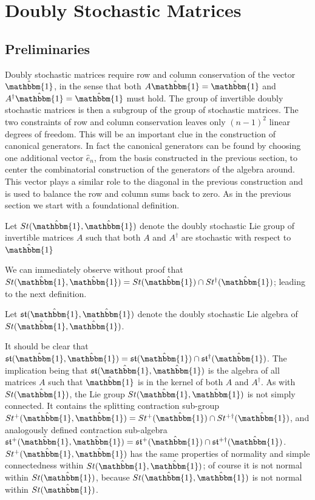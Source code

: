 \section{Doubly Stochastic Matrices}
\subsection{Preliminaries}
Doubly stochastic matrices require row and column conservation of the vector $\hat{\mathbbm{1}}$, 
in the sense that both $A \hat{\mathbbm{1}} = \hat{\mathbbm{1}}$ and $A^\dagger \hat{\mathbbm{1}} = \hat{\mathbbm{1}}$ 
must hold. The group of invertible doubly stochastic matrices is then a subgroup of the
group of stochastic matrices. The two constraints of row and column conservation leaves only
$\left(n - 1\right)^2$ linear degrees of freedom. This will be an important clue in the
construction of canonical generators. In fact the canonical generators can be found by
choosing one additional vector $\hat{e}_n$, from the basis constructed in the previous
section, to center the combinatorial construction of the generators of the algebra around.
This vector plays a similar role to the diagonal in the previous construction and is used to
balance the row and column sums back to zero. As in the previous section we start with a 
foundational definition.
\begin{definition}
	Let $St(\hat{\mathbbm{1}}, \hat{\mathbbm{1}})$ denote the doubly stochastic 
	Lie group of invertible matrices $A$ such that both $A$ and $A^\dagger$ are 
	stochastic with respect to $\hat{\mathbbm{1}}$
\end{definition}
We can immediately observe without proof that $St(\hat{\mathbbm{1}}, \hat{\mathbbm{1}}) = St(\hat{\mathbbm{1}}) \cap St^\dagger(\hat{\mathbbm{1}})$;
leading to the next definition.
\begin{definition}
	Let $\mathfrak{st}(\hat{\mathbbm{1}}, \hat{\mathbbm{1}})$ denote the doubly 
	stochastic Lie algebra of $St(\hat{\mathbbm{1}},\hat{\mathbbm{1}})$.
\end{definition}
It should be clear that $\mathfrak{st}(\hat{\mathbbm{1}}, \hat{\mathbbm{1}}) = \mathfrak{st}(\hat{\mathbbm{1}}) \cap \mathfrak{st}^\dagger(\hat{\mathbbm{1}})$.
The implication being that $\mathfrak{st}(\hat{\mathbbm{1}}, \hat{\mathbbm{1}})$ is the
algebra of all matrices $A$ such that $\hat{\mathbbm{1}}$ is in the kernel of both $A$ and $A^\dagger$.
As with $St(\hat{\mathbbm{1}})$, the Lie group $St(\hat{\mathbbm{1}}, \hat{\mathbbm{1}})$ is
not simply connected. It contains the splitting contraction sub-group $St^{+}(\hat{\mathbbm{1}}, \hat{\mathbbm{1}}) = St^{+}(\hat{\mathbbm{1}}) \cap St^{+\dagger}(\hat{\mathbbm{1}})$,
and analogously defined contraction sub-algebra $\mathfrak{st}^{+}(\hat{\mathbbm{1}}, \hat{\mathbbm{1}}) = \mathfrak{st}^{+}(\hat{\mathbbm{1}}) \cap \mathfrak{st}^{+\dagger}(\hat{\mathbbm{1}})$. 
$St^{+}(\hat{\mathbbm{1}}, \hat{\mathbbm{1}})$ has the same properties of normality and 
simple connectedness within $St(\hat{\mathbbm{1}}, \hat{\mathbbm{1}})$; of course it is not
normal within $St(\hat{\mathbbm{1}})$, because $St(\hat{\mathbbm{1}}, \hat{\mathbbm{1}})$ is
not normal within $St(\hat{\mathbbm{1}})$.

